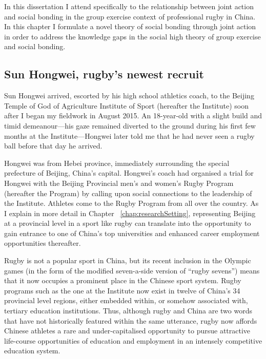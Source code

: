 In this dissertation I attend specifically to the relationship between joint action and social bonding in the group exercise context of professional rugby in China.  In this chapter I formulate a novel theory of social bonding through joint action in order to address the knowledge gaps in the social high theory of group exercise and social bonding.


                                  \begin{CJK}{UTF8}{gbsn}

\section{Sun Hongwei, rugby's newest recruit\label{sect:SHW}}
Sun Hongwei arrived, escorted by his high school athletics coach, to the Beijing Temple of God of Agriculture Institute of Sport (hereafter the Institute) soon after I began my fieldwork in August 2015.  An 18-year-old with a slight build and timid demeanour---his gaze remained diverted to the ground during his first few months at the Institute---Hongwei later told me that he had never seen a rugby ball before that day he arrived.

Hongwei was from Hebei province, immediately surrounding the special prefecture of Beijing, China's capital.  Hongwei's coach had organised a trial for Hongwei with the Beijing Provincial men’s and women's Rugby Program (hereafter the Program) by calling upon social connections to the leadership of the Institute.  Athletes come to the Rugby Program from all over the country.  As I explain in more detail in Chapter ~\ref{chap:researchSetting}, representing Beijing at a provincial level in a sport like rugby can translate into the opportunity to gain entrance to one of China's top universities and enhanced career employment opportunities thereafter.

Rugby is not a popular sport in China, but its recent inclusion in the Olympic games (in the form of the modified seven-a-side version of ``rugby sevens'') means that it now occupies a prominent place in the Chinese sport system.  Rugby programs such as the one at the Institute now exist in twelve of China's 34 provincial level regions, either embedded within, or somehow associated with, tertiary education institutions.  Thus, although rugby and China are two words that have not historically featured within the same utterance, rugby now affords Chinese athletes a rare and under-capitalised opportunity to pursue attractive life-course opportunities of education and employment in an intensely competitive education system.


\end{CJK}
